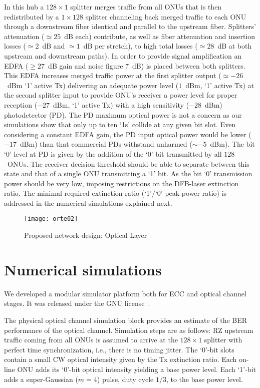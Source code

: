 \documentclass[10pt]{article}
\begin{document}
In this hub a $128\times 1$ splitter merges traffic from all ONUs that is then redistributed by a $1\times 128$ splitter channeling back merged traffic to each ONU through a downstream fiber identical and parallel to the upstream fiber.
Splitters' attenuation ($\simeq25$~dB each) contribute, as well as fiber attenuation and insertion losses ($\simeq2$~dB and $\simeq1$~dB per stretch), to high total losses ($\simeq28$~dB at both upstream and downstream paths).
In order to provide signal amplification an EDFA ($\geq27$~dB gain and noise figure $7$~dB) is placed between both splitters.
This EDFA increases merged traffic power at the first splitter output ($\simeq-26$~dBm `1' active Tx) delivering an adequate power level ($1$~dBm, `1' active Tx) at the second splitter input to provide ONU's receiver a power level for proper reception ($-27$~dBm, `1' active Tx) with a high sensitivity ($-28$~dBm) photodetector (PD).
The PD maximum optical power is not a concern as our simulations show that only up to ten `1s' collide at any given bit slot.
Even considering a constant EDFA gain, the PD input optical power would be lower ($-17$~dBm) than that commercial PDs withstand unharmed ($\sim -5$~dBm).
The bit `0' level at PD is given by the addition of the `0' bit transmitted 
by all $128$~ONUs.
The receiver decision threshold should be able to separate between this state and that of a single ONU transmitting a `1' bit.
As the bit `0' transmission power should be very low, imposing
restrictions on the DFB-laser extinction ratio.
The minimal required extinction ratio (`1'$/$`0' peak power ratio) is addressed in the numerical simulations explained next.
\begin{figure}[!t]
  \centering
    \texttt{[image: orte02]}
    \caption{Proposed network design: Optical Layer}
    \label{arch:fig1}
\end{figure}


\section{Numerical simulations}
We developed a modular simulator platform both for ECC and optical channel stages.
It was released under the GNU license~\cite{sim1}.

The physical optical channel simulation block provides an estimate of
the BER performance of the optical channel. Simulation steps are as
follows: RZ upstream traffic coming from all ONUs is assumed to arrive
at the $128\times1$ splitter with perfect time synchronization, i.e., there is no timing jitter. 
The `0'-bit slots contain a small CW optical intensity given by the Tx extinction ratio. 
Each on-line ONU adds its `0'-bit optical intensity yielding a base power level.
Each `1'-bit adds a super-Gaussian ($m=4$) pulse, duty cycle $1/3$, to the base power level. 
 
\end{document}
